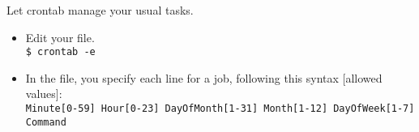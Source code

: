 Let crontab manage your usual tasks.
\begin{itemize}[label={-}, leftmargin=*]
    \item Edit your file.\\
    {\tt \$ crontab -e}
    
    \item In the file, you specify each line for a job, following this syntax [allowed values]:\\
    {\tt Minute[0-59] Hour[0-23] DayOfMonth[1-31] Month[1-12] DayOfWeek[1-7] Command}
    
\end{itemize}    
